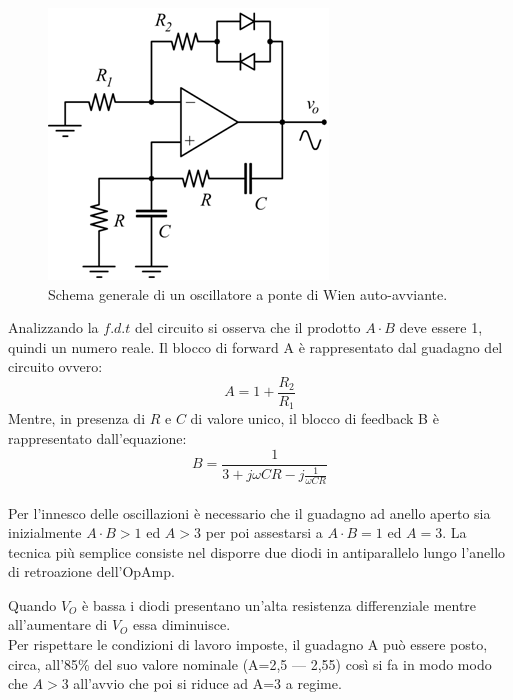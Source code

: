 \documentclass[titlepage]{report}
\begin{document}
	\begin{figure}[h]
		\centering
		\includegraphics[scale=0.7]{Immagini/sch_osc_wien.png}
		\caption{Schema generale di un oscillatore a ponte di Wien auto-avviante.}
		\label{fig:sch_osc_wien}
	\end{figure}
	
	\noindent Analizzando la $f.d.t$ del circuito si osserva che il prodotto $A\cdot B$ deve essere 1, quindi un numero reale.
	Il blocco di forward A è rappresentato dal guadagno del circuito ovvero: 
	\begin{equation}
		\label{eq:LF356_Gain}
		A = 1 + \frac{R_2}{R_1}
	\end{equation}
	Mentre, in presenza di $R$ e $C$ di valore unico, il blocco di feedback B è rappresentato dall'equazione:
	\\
	\begin{equation}
		\label{eq:LF356_Feedback}
		B = \frac{1}{3 + j\omega C R - j\frac{1}{\omega C R}}
	\end{equation}
	\\
	Per l'innesco delle oscillazioni è necessario che il guadagno ad anello aperto sia inizialmente $A\cdot B>1$ ed $A>3$ per poi assestarsi a $A\cdot B=1$ ed $A=3$. La tecnica più semplice consiste nel disporre due diodi in antiparallelo lungo l'anello di retroazione dell'OpAmp.
	
	\noindent Quando \textit{$V_{O}$} è bassa i diodi presentano un'alta resistenza differenziale mentre all'aumentare di \textit{$V_{O}$} essa diminuisce. 
	\\ Per rispettare le condizioni di lavoro imposte, il guadagno A può essere posto, circa, all'85\% del suo valore nominale (A=2,5 — 2,55) così si fa in modo modo che $A>3$ all'avvio che poi si riduce ad A=3 a regime.
\end{document}
